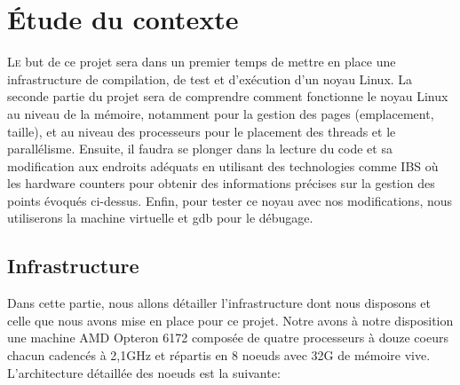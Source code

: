 \chapter{Étude du contexte}

  \lettrine[nindent=0em,lines=3]{L}e but de ce projet sera dans un premier temps
  de mettre en place une infrastructure de compilation, de test et d'exécution
  d'un noyau Linux. La seconde partie du projet sera de comprendre comment
  fonctionne le noyau Linux au niveau de la mémoire, notamment pour la gestion
  des pages (emplacement, taille), et au niveau des processeurs pour le
  placement des threads et le parallélisme. Ensuite, il faudra se plonger dans
  la lecture du code et sa modification aux endroits adéquats en utilisant des
  technologies comme IBS où les hardware counters pour obtenir des informations
  précises sur la gestion des points évoqués ci-dessus. Enfin, pour tester ce
  noyau avec nos modifications, nous utiliserons la machine virtuelle et gdb
  pour le débugage.

  \section{Infrastructure}
    Dans cette partie, nous allons détailler l'infrastructure dont nous
    disposons et celle que nous avons mise en place pour ce projet. Notre avons
    à notre disposition une machine AMD Opteron 6172 composée de quatre
    processeurs à douze coeurs chacun cadencés à 2,1GHz et répartis en 8 noeuds
    avec 32G de mémoire vive. L'architecture détaillée des noeuds est la
    suivante:



